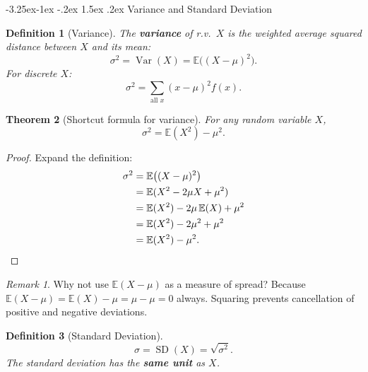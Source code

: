 \documentclass{article}
\makeatletter
\newtheorem{theorem}{Theorem}[section]
\newtheorem{definition}[theorem]{Definition}
\theoremstyle{remark}
\newtheorem*{remark}{Remark}
\newlength{\subsecindent}
\renewcommand\subsection{\@startsection{subsection}{2}{\subsecindent}%
  {-3.25ex\@plus -1ex \@minus -.2ex}%
  {1.5ex \@plus .2ex}%
  {\normalfont\large\bfseries}}
\newenvironment{sub}{%
  \begin{list}{}{%
    \setlength{\leftmargin}{4em}%
    \setlength{\rightmargin}{0pt}%
    \setlength{\topsep}{0pt}%
    \setlength{\partopsep}{0pt}%
    \setlength{\parsep}{\parskip}%
    \setlength{\itemsep}{\parskip}%
  }\item\relax
}{\end{list}}
\newcommand{\E}{\mathbb{E}}
\newcommand{\Var}{\operatorname{Var}}
\newcommand{\SD}{\operatorname{SD}}
\makeatother
\begin{document}
\subsection{Variance and Standard Deviation}
\begin{sub}

\begin{definition}[Variance]
  \label{def:var}
  The \textbf{variance} of r.v.\ $X$ is the weighted average squared distance
  between $X$ and its mean:
  \begin{equation}
    \sigma^2 = \Var(X) = \E\bigl((X - \mu)^2\bigr).
    \label{eq:var-def}
  \end{equation}
  For discrete $X$:
  \begin{equation}
    \sigma^2 = \sum_{\text{all } x} (x - \mu)^2 f(x).
    \label{eq:var-disc}
  \end{equation}
\end{definition}

\begin{theorem}[Shortcut formula for variance]
  \label{thm:var-shortcut}
  For any random variable $X$,
  \begin{equation}
    \boxed{\sigma^2 = \E(X^2) - \mu^2.}
    \label{eq:var-shortcut}
  \end{equation}
\end{theorem}

\begin{proof}
  Expand the definition:
  \begin{align*}
    \sigma^2
      &= \E\bigl((X - \mu)^2\bigr) \\
      &= \E(X^2 - 2\mu X + \mu^2) \\
      &= \E(X^2) - 2\mu \, \E(X) + \mu^2 \\
      &= \E(X^2) - 2\mu^2 + \mu^2 \\
      &= \E(X^2) - \mu^2. \qedhere
  \end{align*}
\end{proof}

\begin{remark}
  Why not use $\E(X - \mu)$ as a measure of spread?
  Because $\E(X - \mu) = \E(X) - \mu = \mu - \mu = 0$ always.
  Squaring prevents cancellation of positive and negative deviations.
\end{remark}

\begin{definition}[Standard Deviation]
  \label{def:sd}
  \begin{equation}
    \sigma = \SD(X) = \sqrt{\sigma^2}.
    \label{eq:sd}
  \end{equation}
  The standard deviation has the \textbf{same unit} as $X$.
\end{definition}

\end{sub}
\end{document}
